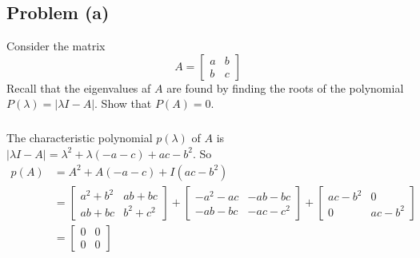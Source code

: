 \documentclass[11pt]{article}
\begin{document}
\subsection*{Problem (a)}
Consider the matrix 
\begin{equation*}
	A=\begin{bmatrix} a & b \\ b & c \end{bmatrix}
\end{equation*}
Recall that the eigenvalues af $A$ are found by finding the roots of the polynomial $P(\lambda)=|\lambda I-A|$. Show that $P(A)=0$.
\subparagraph*{}
The characteristic polynomial $p(\lambda)$ of $A$ is $|\lambda I - A| = \lambda^2 + \lambda(-a-c) + ac - b^2$. So 
\begin{align*}
	p(A) &= A^2 + A(-a-c) + I(ac-b^2) \\
	&= \begin{bmatrix} a^2+b^2 & ab+bc \\ ab+bc & b^2+c^2 \end{bmatrix}+
	\begin{bmatrix} -a^2-ac & -ab-bc \\ -ab-bc & -ac-c^2 \end{bmatrix}+
	\begin{bmatrix} ac-b^2 & 0 \\ 0 & ac-b^2 \end{bmatrix} \\
	&= \begin{bmatrix} 0 & 0 \\ 0 & 0 \end{bmatrix}
\end{align*}
\end{document}
